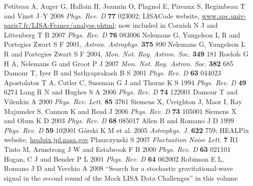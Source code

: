 \documentclass{iopart}
\begin{document}
\begin{thebibliography}{99}
%
 Petiteau A, Auger G, Halloin H, Jeannin O, Plagnol E, Pireaux S, Regimbeau T and Vinet J--Y 2008 \emph{Phys. Rev. D} \textbf{77} 023002; LISACode website, \url{www.apc.univ-paris7.fr/LISA-France/analyse.phtml}; now included in \cite{lisatools}
%
 Cornish N J and Littenberg T B 2007 \textit{Phys. Rev. D} \textbf{76} 083006
%
 Nelemans G, Yungelson L R and Portegies Zwart S F 2001, \textit{Astron. Astrophys.} \textbf{375} 890
%
 Nelemans G, Yungelson L R and Portegies Zwart S F 2004, \emph{Mon. Not. Roy. Astron. Soc.} {\bf 349} 181
%
 Roelofs G H A, Nelemans G and Groot P J 2007
\emph{Mon. Not. Roy. Astron. Soc.} {\bf 382} 685
%
 Damour T, Iyer B and Sathyaprakash B S 2001 \textit{Phys. Rev. D} {\bf 63} 044023
%
 Apostolatos T A, Cutler C, Sussman G J and Thorne K S 1994 \textit{Phys. Rev. D} \textbf{49} 6274
%
 Lang R N and Hughes S A 2006 \textit{Phys. Rev. D} {\bf 74} 122001
%
%
 Damour T and Vilenkin A 2000 \textit{Phys. Rev. Lett.} {\bf 85} 3761
%
 Siemens X, Creighton J, Maor I, Ray Majumder S,
Cannon K and Read J 2006 \textit{Phys. Rev. D} {\bf 73} 105001
%
 Siemens X and Olum K D 2003 \textit{Phys. Rev. D} {\bf 68} 085017
%
 Allen B and Romano J D 1999 \textit{Phys. Rev. D} {\bf 59} 102001
%
 G\'orski K M et al. 2005 \textit{Astrophys. J.} {\bf 622} 759; HEALPix website, \url{healpix.jpl.nasa.gov}
%
 Plaszczynski S 2007 \textit{Fluctuation Noise Lett.} {\bf 7} R1
%
 Tinto M, Armstrong J W and Estabrook F B 2000 \textit{Phys. Rev. D} \textbf{63} 021101
%
 Hogan, C J and Bender P L 2001 \textit{Phys. Rev. D} \textbf{64} 062002 
%
 Robinson E L, Romano J D and Vecchio A 2008 ``Search for a stochastic gravitational-wave signal in the second round of the Mock LISA Data Challenges'' in this volume
%
\end{thebibliography}
\end{document}
